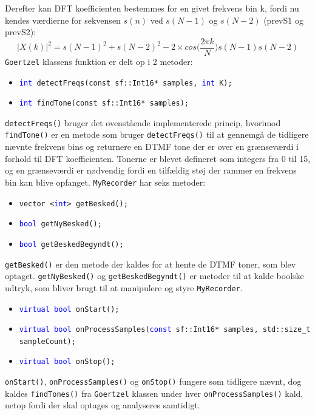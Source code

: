 \newline
Derefter kan DFT koefficienten bestemmes for en givet frekvens bin k, fordi nu kendes værdierne for sekvensen $s(n)$ ved $s(N-1)$ og $s(N-2)$ (prevS1 og prevS2):
$$|X(k)|^2 = s(N-1)^2 + s(N-2)^2 - 2 \times cos\bigg(\frac{2 \pi k}{N}\bigg) s(N-1)s(N-2)$$
\newline
\texttt{Goertzel} klassens funktion er delt op i 2 metoder:
\begin{itemize}
	\item \texttt{\textcolor{blue}{int} detectFreqs(const sf::\textcolor{dkgreen}{Int16*} samples, \textcolor{blue}{int} K);}
	
	\item \texttt{\textcolor{blue}{int} findTone(const sf::\textcolor{dkgreen}{Int16*} samples);}
\end{itemize}
\texttt{detectFreqs()} bruger det ovenstående implementerede princip, hvorimod \texttt{findTone()} er en metode som bruger \texttt{detectFreqs()} til at gennemgå de tidligere nævnte frekvens bins og returnere en DTMF tone der er over en grænseværdi i forhold til DFT koefficienten. Tonerne er blevet defineret som integers fra 0 til 15, og en grænseværdi er nødvendig fordi en tilfældig støj der rammer en frekvens bin kan blive opfanget.
\newline
\texttt{MyRecorder} har seks metoder:
\begin{itemize}
	\item \texttt{\textcolor{dkgreen}{vector} <\textcolor{blue}{int}> getBesked();}
	
	\item \texttt{\textcolor{blue}{bool} getNyBesked();}
	
	\item \texttt{\textcolor{blue}{bool} getBeskedBegyndt();}
\end{itemize}
\texttt{getBesked()} er den metode der kaldes for at hente de DTMF toner, som blev optaget.
\newline
\texttt{getNyBesked()} og \texttt{getBeskedBegyndt()} er metoder til at kalde boolske udtryk, som bliver brugt til at manipulere og styre \texttt{MyRecorder}.
\begin{itemize}
	\item \texttt{\textcolor{blue}{virtual bool} onStart();}
	
	\item \texttt{\textcolor{blue}{virtual bool} onProcessSamples(\textcolor{blue}{const} sf::\textcolor{dkgreen}{Int16*} samples, std::\textcolor{dkgreen}{size\_t} sampleCount);}
	
	\item \texttt{\textcolor{blue}{virtual bool} onStop();}
\end{itemize}
\texttt{onStart()}, \texttt{onProcessSamples()} og \texttt{onStop()} fungere som tidligere nævnt, dog kaldes \texttt{findTones()} fra \texttt{Goertzel} klassen under hver \texttt{onProcessSamples()} kald, netop fordi der skal optages og analyseres samtidigt.
\hfill \break

